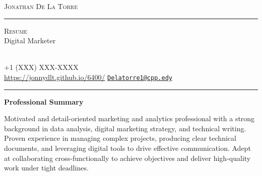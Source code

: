 \documentclass[10pt,a4paper,]{article}
\renewcommand{\section}[1]
{
	\begin{center}
		\large\textcolor{sectcol}{\textbf{#1}}
	\end{center}
}
\newcommand{\metasection}[2]
{
\footnotesize{#2} \hspace*{\fill} \footnotesize{#1}\\[1pt]
}
\begin{document}
\pagestyle{fancy}






\vspace{-8pt}
\begin{center}
	\HUGE \textsc{Jonathan De La
Torre} \textcolor{sectcol}{\rule[-1mm]{1mm}{0.9cm}} \textsc{Resume}\\[2pt]
	\small Digital Marketer
\end{center}


\vspace{6pt}


\metasection{}{}
\metasection{ +1 (XXX) XXX-XXXX}{}
\metasection{ \href{mailto:Delatorre1@cpp.edy}{\nolinkurl{Delatorre1@cpp.edy}}}{\faicon{home} \href{http://\url{https://jonnydlt.github.io/6400/}}{\url{https://jonnydlt.github.io/6400/}}}
\vspace{-2pt}
\textcolor{softcol}{\hrule}
\vspace{6pt}

\normalsize



%
%



\section{Professional Summary}\label{professional-summary}

Motivated and detail-oriented marketing and analytics professional with
a strong background in data analysis, digital marketing strategy, and
technical writing. Proven experience in managing complex projects,
producing clear technical documents, and leveraging digital tools to
drive effective communication. Adept at collaborating cross-functionally
to achieve objectives and deliver high-quality work under tight
deadlines.
\end{document}
